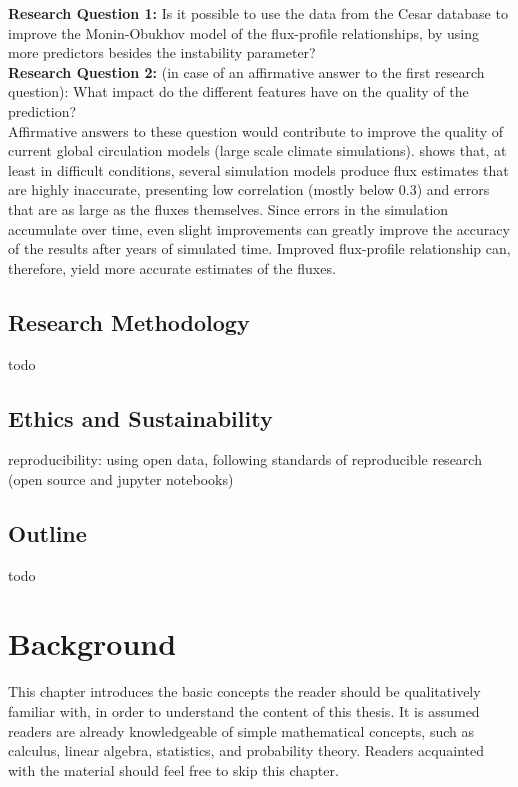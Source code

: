 \documentclass[12pt]{book}
\begin{document}
\textbf{Research Question 1:} Is it possible to use the data from the Cesar database to improve the Monin-Obukhov model of the flux-profile relationships, by using more predictors besides the instability parameter? \\

\textbf{Research Question 2:} (in case of an affirmative answer to the first research question): What impact do the different features have on the quality of the prediction? \\

Affirmative answers to these question would contribute to improve the quality of current global circulation models (large scale climate simulations). \cite{sheba} shows that, at least in difficult conditions, several simulation models produce flux estimates that are highly inaccurate, presenting low correlation (mostly below 0.3) and errors that are as large as the fluxes themselves. Since errors in the simulation accumulate over time, even slight improvements can greatly improve the accuracy of the results after years of simulated time. Improved flux-profile relationship can, therefore, yield more accurate estimates of the fluxes.

\section{Research Methodology}
todo

\section{Ethics and Sustainability}

reproducibility: using open data, following standards of reproducible research (open source and jupyter notebooks)

\section{Outline}
todo

\chapter{Background}
This chapter introduces the basic concepts the reader should be qualitatively familiar with, in order to understand the content of this thesis. It is assumed readers are already knowledgeable of simple mathematical concepts, such as calculus, linear algebra, statistics, and probability theory. Readers acquainted with the material should feel free to skip this chapter.
\end{document}
